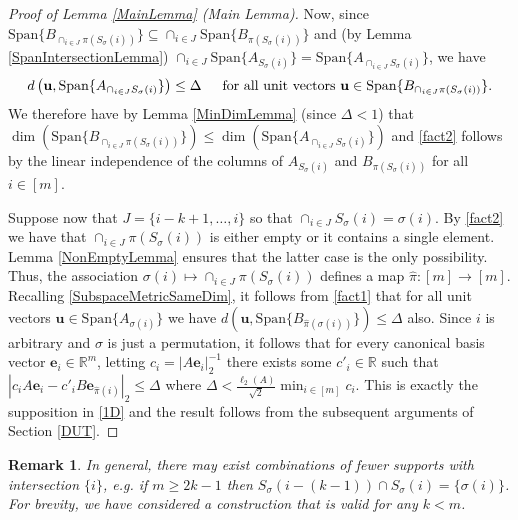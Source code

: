 \documentclass[journal, onecolumn]{IEEEtran}
\newtheorem{remark}{Remark}
\begin{document}
\begin{proof}[Proof of Lemma \ref{MainLemma} (Main Lemma)]
Now, since \mbox{$\text{Span}\{B_{\cap_{i \in J}\pi(S_\sigma(i))}\} \subseteq \cap_{i \in J} \text{Span}\{B_{\pi(S_\sigma(i))}\}$} and (by Lemma \ref{SpanIntersectionLemma}) $\cap_{i \in J}  \text{Span}\{A_{S_\sigma(i)}\} = \text{Span}\{A_{\cap_{i \in J}  S_\sigma(i)}\}$, we have
\begin{align}\label{fact1}
d\left( \mathbf{u}, \text{Span}\{A_{\cap_{i \in J} S_\sigma(i)}\} \right) \leq \Delta \indent \text{for all unit vectors } \mathbf{u} \in \text{Span}\{B_{\cap_{i \in J}\pi(S_\sigma(i))}\}.
\end{align}
We therefore have by Lemma \ref{MinDimLemma} (since $\Delta < 1$) that $\dim(\text{Span}\{B_{\cap_{i \in J}\pi(S_\sigma(i))}\}) \leq \dim(\text{Span}\{A_{\cap_{i \in J} S_\sigma(i)}\})$ and \eqref{fact2} follows by the linear independence of the columns of $A_{S_\sigma(i)}$ and $B_{\pi(S_\sigma(i))}$ for all $i \in [m]$.

Suppose now that $J = \{i-k+1, \ldots, i\}$ so that $\cap_{i \in J} S_\sigma(i) = \sigma(i)$. By \eqref{fact2} we have that $\cap_{i \in J} \pi(S_\sigma(i))$ is either empty or it contains a single element. Lemma \ref{NonEmptyLemma} ensures that the latter case is the only possibility. Thus, the association $\sigma(i) \mapsto \cap_{i \in J} \pi(S_\sigma(i))$ defines a map $\hat \pi: [m] \to [m]$. Recalling \eqref{SubspaceMetricSameDim}, it follows from \eqref{fact1} that for all unit vectors $\mathbf{u} \in \text{Span}\{A_{\sigma(i)}\}$ we have $d\left( \mathbf{u}, \text{Span}\{B_{\hat \pi(\sigma(i))}\}\right) \leq \Delta$ also. Since $i$ is arbitrary and $\sigma$ is just a permutation, it follows that for every canonical basis vector $\mathbf{e}_i \in \mathbb{R}^m$, letting $c_i = |A\mathbf{e}_i|_2^{-1}$ there exists some $c'_i \in \mathbb{R}$ such that $|c_iA\mathbf{e}_i - c'_iB\mathbf{e}_{\hat \pi(i)}|_2 \leq \Delta$ where $\Delta < \frac{\ell_2(A)}{\sqrt{2}} \min_{i \in [m]} c_i$. This is exactly the supposition in \eqref{1D} and the result follows from the subsequent arguments of Section \ref{DUT}. 
\end{proof}

\begin{remark} In general, there may exist combinations of fewer supports with intersection $\{i\}$, e.g. if $m \geq 2k-1$ then $S_\sigma(i - (k-1)) \cap S_\sigma(i) = \{\sigma(i)\}$. For brevity, we have considered a construction that is valid for any $k < m$.
\end{remark}

\end{document}
